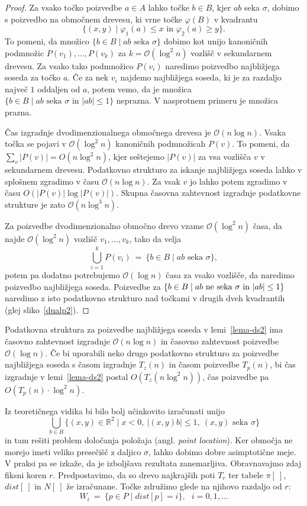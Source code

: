 \documentclass[a4paper, 12pt]{book}
\newcommand{\RR}{\ensuremath{\mathbb R}}  %
\newcommand{\OO}{\ensuremath{\mathcal{O}}} %
\def\dist{\mathit{dist}}
\begin{document}
\begin{proof}
Za vsako točko poizvedbe $a \in A$ lahko točke $b \in B$, kjer $ab$ seka $\sigma$, dobimo s poizvedbo na območnem drevesu, ki vrne točke $\varphi(B)$ v kvadrantu
\[
		\{(x,y)\mid  \varphi_1(a) \leq x \text{ in } \varphi_2(a) \geq y\}.
\]
To pomeni, da množico $\{ b\in B \mid \text{$ab$ seka $\sigma$}\}$ dobimo kot unijo kanoničnih podmnožic $P(v_1),...,P(v_k)$ za $k = \OO(\log^2n)$ vozlišč v sekundarnem drevesu. Za vsako tako podmnožico $P(v_i)$ naredimo poizvedbo najbližjega soseda za točko $a$. Če za nek $v_i$ najdemo najbližjega soseda, ki je za razdaljo največ $1$ oddaljen od $a$, potem vemo, da je množica $\{ b\in B \mid \text{$ab$ seka $\sigma$ in $|ab|\le 1$}\}$ neprazna. V nasprotnem primeru je množica prazna.

Čas izgradnje dvodimenzionalnega območnega drevesa je $\OO(n\log n)$. Vsa\-ka točka se pojavi v $\OO(\log^2n)$ kanoničnih podmnožicah $P(v)$. To pomeni, da $\sum_v |P(v)| = O( n\log^2 n)$, kjer seštejemo $|P(v)|$ za vsa vozlišča $v$ v sekundarnem drevesu. Podatkovno strukturo za iskanje najbližjega soseda lahko v splošnem zgradimo v času $\OO(n\log n)$. Za vsak $v$ jo lahko potem zgradimo v času $O(|P(v)| \log |P(v)|)$. Skupna časovna zahtevnost izgradnje podatkovne strukture je zato $\OO(n\log^3n)$.

Za poizvedbe dvodimenzionalno območno drevo vzame $\OO(\log^2n)$ časa, da  najde $\OO(\log^2n)$ vozlišč $v_1,...,v_k$, tako da velja
\[
		\bigcup_{i=1}^k P(v_i) ~=~ \{ b\in B \mid \text{$ab$ seka $\sigma$}\},
\]
potem pa dodatno potrebujemo $\OO(\log n)$ časa za vsako vozlišče, da naredimo poizvedbo najbližjega soseda. Poizvedbe za $\{ b\in B \mid \text{$ab$ ne seka $\sigma$ in $\-|ab|\le 1$}\}$ naredimo z isto podatkovno strukturo nad točkami v drugih dveh kvadrantih (glej sliko~\ref{dualp2}).
\end{proof}

Podatkovna struktura za poizvedbe najbližjega soseda v lemi~\ref{lema-ds2} ima časovno zahtevnost izgradnje $\OO(n\log n)$ in časovno zahtevnost poizvedbe $\OO(\log n)$. Če bi uporabili neko drugo podatkovno strukturo za poizvedbe najbližjega soseda s časom izgradnje $T_z(n)$ in časom poizvedbe $T_p(n)$, bi čas izgradnje v lemi~\ref{lema-ds2} postal $O(T_z(n\log^2 n))$, čas poizvedbe pa $O(T_p(n)\cdot \log^2 n)$.

Iz teoretičnega vidika bi bilo bolj učinkovito izračunati unijo
\[
	\bigcup_{b\in B} \{ (x,y)\in \RR^2\mid x<0,~ |(x,y)b|\le 1,~ (x,y) 
			\text{ seka } \sigma \}
\]
in tam rešiti problem določanja položaja (angl. \textit{point location}). Ker območja ne morejo imeti veliko presečišč z daljico $\sigma$, lahko dobimo dobre asimptotične meje. V praksi pa se izkaže, da je izboljšava rezultata zanemarljiva.
\bigbreak
Obravnavajmo zdaj fiksni koren $r$. Predpostavimo, da so drevo najkrajših poti $T_r$ ter tabele $\pi[~]$, $\dist[~]$ in $N[~]$ že izračunane. Točke združimo glede na njihovo razdaljo od $r$:
\[
	W_i ~=~ \{ p\in P \mid \dist[p]=i \},~~~ i=0,1,\dots
\]
\end{document}
